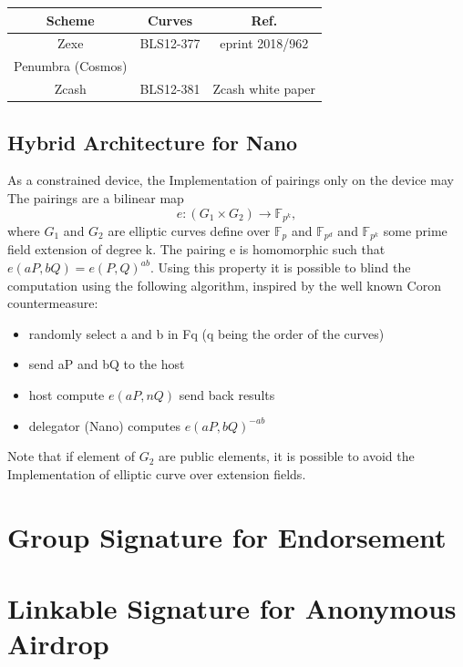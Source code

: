 \documentclass[11pt]{llncs2e/llncs}
\begin{document}
\begin{table}[h!]
\begin{center}
 
\begin{tabular}{|c| c| c|}
\hline
 Scheme & Curves & Ref.\\
 \hline
 Zexe   & BLS12-377 & eprint 2018/962\\
 Penumbra (Cosmos) & &  \\
 \hline
 Zcash & BLS12-381 & Zcash white paper\\
 \hline
\end{tabular}
\end{center}
\end{table}

\subsection{Hybrid Architecture for Nano}
As a constrained device, the Implementation of pairings only on the device may 
The pairings are a bilinear map $$e:(G_1 \times G_2) \rightarrow \mathbb{F}_{p^k}, $$ where $G_1$ and $G_2$ are elliptic curves define over $\mathbb{F}_p$ and $\mathbb{F}_{p^d}$ and $\mathbb{F}_{p^k}$ some prime field extension of degree k. The pairing e is homomorphic such that $e(aP, bQ)=e(P,Q)^{ab}$. Using this property it is possible to blind the computation using the following algorithm, inspired by the well known Coron countermeasure:
\begin{itemize}
 \item randomly select a and b in Fq (q being the order of the curves)
 \item send aP and bQ to the host
\item host compute $e(aP,nQ)$ send back results
\item delegator (Nano) computes $e(aP, bQ)^{-ab}$
\end{itemize}
Note that if element of $G_2$ are public elements, it is possible to avoid the Implementation of elliptic curve over extension fields.

\section{Group Signature for Endorsement}


\section{Linkable Signature for Anonymous Airdrop}
\end{document}
